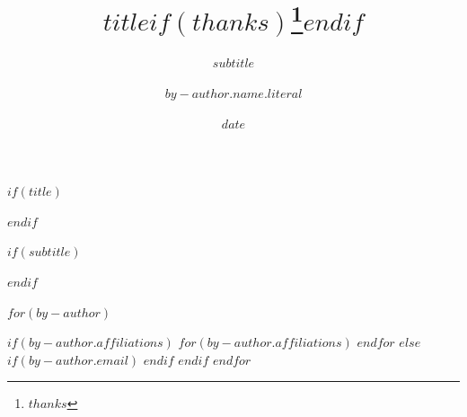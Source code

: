 $if(title)$
\title{$title$$if(thanks)$\thanks{$thanks$}$endif$}
$endif$

$if(subtitle)$
\subtitle{$subtitle$}
$endif$

$for(by-author)$
  \author{$by-author.name.literal$}
  $if(by-author.affiliations)$
    $for(by-author.affiliations)$
    $endfor$
  $else$
    $if(by-author.email)$
    $endif$
  $endif$
$endfor$

\date{$date$}

